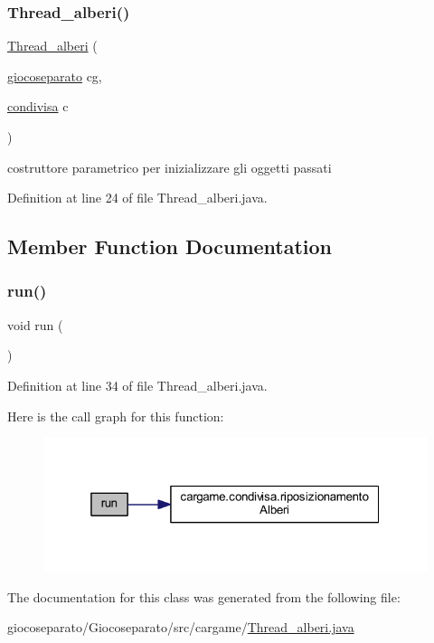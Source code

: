 \subsubsection{\texorpdfstring{Thread\+\_\+alberi()}{Thread\_alberi()}}
{\footnotesize\ttfamily \hyperlink{classcargame_1_1_thread__alberi}{Thread\+\_\+alberi} (\begin{DoxyParamCaption}\item[{\hyperlink{classcargame_1_1giocoseparato}{giocoseparato}}]{cg,  }\item[{\hyperlink{classcargame_1_1condivisa}{condivisa}}]{c }\end{DoxyParamCaption})}



costruttore parametrico per inizializzare gli oggetti passati 



Definition at line 24 of file Thread\+\_\+alberi.\+java.



\subsection{Member Function Documentation}
\mbox{\label{classcargame_1_1_thread__alberi_a13a43e6d814de94978c515cb084873b1}} 
\subsubsection{\texorpdfstring{run()}{run()}}
{\footnotesize\ttfamily void run (\begin{DoxyParamCaption}{ }\end{DoxyParamCaption})}



Definition at line 34 of file Thread\+\_\+alberi.\+java.

Here is the call graph for this function\+:
\nopagebreak
\begin{figure}[H]
\begin{center}
\leavevmode
\includegraphics[width=319pt]{classcargame_1_1_thread__alberi_a13a43e6d814de94978c515cb084873b1_cgraph}
\end{center}
\end{figure}


The documentation for this class was generated from the following file\+:\begin{DoxyCompactItemize}
\item 
giocoseparato/\+Giocoseparato/src/cargame/\hyperlink{_thread__alberi_8java}{Thread\+\_\+alberi.\+java}\end{DoxyCompactItemize}
